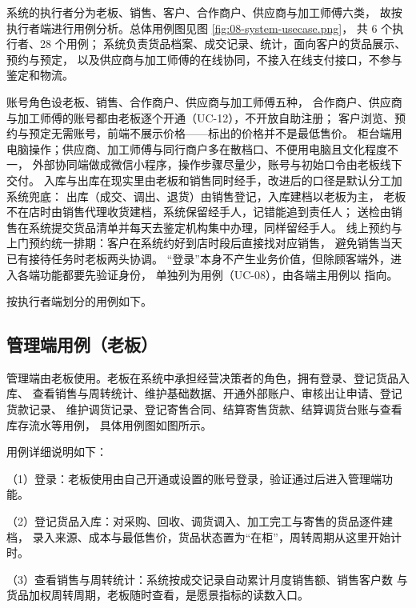 系统的执行者分为老板、销售、客户、合作商户、供应商与加工师傅六类，
故按执行者端进行用例分析。总体用例图见图 \ref{fig:08-system-usecase.png}，
共 6 个执行者、28 个用例；
系统负责货品档案、成交记录、统计，面向客户的货品展示、预约与预定，
以及供应商与加工师傅的在线协同，不接入在线支付接口，不参与鉴定和物流。


账号角色设老板、销售、合作商户、供应商与加工师傅五种，
合作商户、供应商与加工师傅的账号都由老板逐个开通（UC-12），不开放自助注册；
客户浏览、预约与预定无需账号，前端不展示价格——标出的价格并不是最低售价。
柜台端用电脑操作；供应商、加工师傅与同行商户多在散档口、不便用电脑且文化程度不一，
外部协同端做成微信小程序，操作步骤尽量少，账号与初始口令由老板线下交付。
入库与出库在现实里由老板和销售同时经手，改进后的口径是默认分工加系统兜底：
出库（成交、调出、退货）由销售登记，入库建档以老板为主，
老板不在店时由销售代理收货建档，系统保留经手人，记错能追到责任人；
送检由销售在系统提交货品清单并每天去鉴定机构集中办理，同样留经手人。
线上预约与上门预约统一排期：客户在系统约好到店时段后直接找对应销售，
避免销售当天已有接待任务时老板两头协调。
“登录”本身不产生业务价值，但除顾客端外，进入各端功能都要先验证身份，
单独列为用例（UC-08），由各端主用例以  指向。

按执行者端划分的用例如下。

\subsection{管理端用例（老板）}

管理端由老板使用。老板在系统中承担经营决策者的角色，拥有登录、登记货品入库、
查看销售与周转统计、维护基础数据、开通外部账户、审核出让申请、登记货款记录、
维护调货记录、登记寄售合同、结算寄售货款、结算调货台账与查看库存流水等用例，
具体用例图如图所示。


用例详细说明如下：

\noindent（1）登录：老板使用由自己开通或设置的账号登录，验证通过后进入管理端功能。

\noindent（2）登记货品入库：对采购、回收、调货调入、加工完工与寄售的货品逐件建档，
录入来源、成本与最低售价，货品状态置为“在柜”，周转周期从这里开始计时。

\noindent（3）查看销售与周转统计：系统按成交记录自动累计月度销售额、销售客户数
与货品加权周转周期，老板随时查看，是愿景指标的读数入口。

